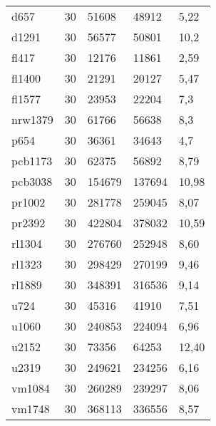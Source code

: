 \begin{center}
\begin{longtable}{lclll}
			d657 & 30 & 51608 & 48912 & 5,22 \\
			d1291 & 30 & 56577 & 50801 & 10,2  \\
			fl417 & 30 & 12176 & 11861 & 2,59\\
			fl1400 & 30 & 21291 & 20127 &  5,47 \\
			fl1577 & 30 & 23953 & 22204 &  7,3\\
			nrw1379 & 30 & 61766 & 56638 & 8,3 \\
			p654 & 30 & 36361 & 34643 & 4,7 \\
			pcb1173 & 30 & 62375 & 56892 & 8,79  \\
			pcb3038 & 30 & 154679 & 137694 & 10,98  \\
			pr1002 & 30 & 281778 & 259045 & 8,07  \\
			pr2392 & 30 & 422804 & 378032 & 10,59 \\
			rl1304 & 30 & 276760 & 252948 & 8,60  \\
			rl1323 & 30  & 298429 & 270199 &  9,46 \\
			rl1889 & 30 & 348391 & 316536 & 9,14 \\
			u724 & 30 & 45316 & 41910 & 7,51 \\
			u1060 & 30 & 240853 & 224094 & 6,96  \\
			u2152 & 30 & 73356 & 64253 & 12,40 \\
			u2319 & 30 & 249621 & 234256 & 6,16 \\
			vm1084 & 30 & 260289 & 239297 & 8,06  \\
			vm1748 & 30 & 368113 & 336556 & 8,57 \\

\end{longtable}
\end{center}

